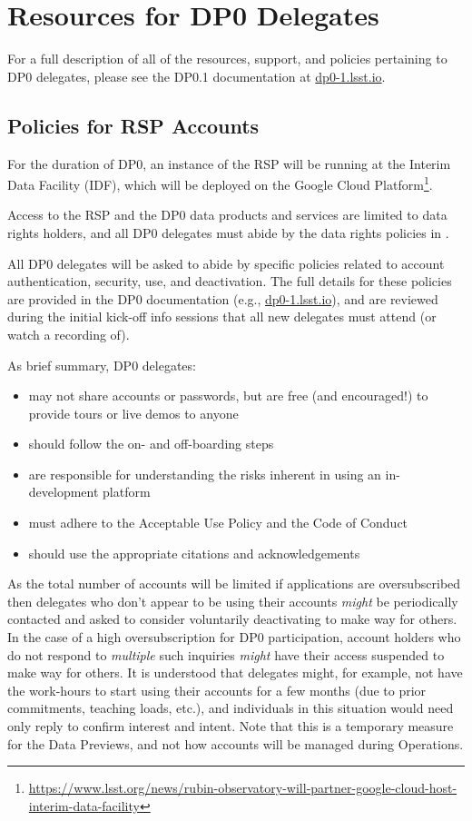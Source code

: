 \documentclass[DM,lsstdraft,authoryear,toc]{lsstdoc}
\begin{document}
\section{Resources for DP0 Delegates}\label{sec:res}

For a full description of all of the resources, support, and policies pertaining to DP0 delegates, please see the DP0.1 documentation at \url{dp0-1.lsst.io}.

\subsection{Policies for RSP Accounts}\label{ssec:res_pol}

For the duration of DP0, an instance of the RSP will be running at the Interim Data Facility (IDF), which will be deployed on the Google Cloud Platform\footnote{\url{https://www.lsst.org/news/rubin-observatory-will-partner-google-cloud-host-interim-data-facility}}.

Access to the RSP and the DP0 data products and services are limited to data rights holders, and all DP0 delegates must abide by the data rights policies in .

All DP0 delegates will be asked to abide by specific policies related to account authentication, security, use, and deactivation.
The full details for these policies are provided in the DP0 documentation (e.g., \url{dp0-1.lsst.io}), and are reviewed during the initial kick-off info sessions that all new delegates must attend (or watch a recording of).

As brief summary, DP0 delegates:
\begin{itemize}
\item may not share accounts or passwords, but are free (and encouraged!) to provide tours or live demos to anyone
\item should follow the on- and off-boarding steps
\item are responsible for understanding the risks inherent in using an in-development platform
\item must adhere to the Acceptable Use Policy and the Code of Conduct
\item should use the appropriate citations and acknowledgements
\end{itemize}

As the total number of accounts will be limited if applications are oversubscribed then delegates who don't appear to be using their accounts {\it might} be periodically contacted and asked to consider voluntarily deactivating to make way for others.
In the case of a high oversubscription for DP0 participation, account holders who do not respond to \emph{multiple} such inquiries \emph{might} have their access suspended to make way for others.
It is understood that delegates might, for example, not have the work-hours to start using their accounts for a few months (due to prior commitments, teaching loads, etc.), and individuals in this situation would need only reply to confirm interest and intent. 
Note that this is a temporary measure for the Data Previews, and not how accounts will be managed during Operations.
\end{document}
